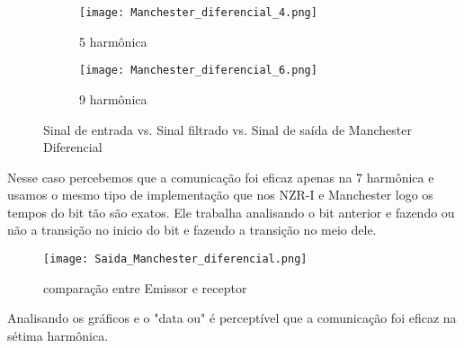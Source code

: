 \documentclass{article}
\begin{document}
\begin{figure}[H]
\begin{multicols}{2}
                    \begin{figure}[H]
                        \begin{center}
                            \texttt{[image: Manchester\_diferencial\_4.png]}
                            \caption{5 harmônica}
                            \label{fig:Manchester_diferencial_4}
                        \end{center}
                    \end{figure}
                    \begin{figure}[H]
                        \begin{center}
                            \texttt{[image: Manchester\_diferencial\_6.png]}
                            \caption{9 harmônica}
                            \label{fig:Manchester_diferencial_6}
                        \end{center}
                    \end{figure}
                \end{multicols}
                \caption{Sinal de entrada vs. Sinal filtrado vs. Sinal de saída de Manchester Diferencial}
                \label{fig:Manchester_diferencial}
            \end{figure}
            Nesse caso percebemos que a comunicação foi eficaz apenas na 7 harmônica e usamos o mesmo tipo de implementação que nos NZR-I e Manchester logo os tempos do bit tão são exatos. Ele trabalha analisando o bit anterior e fazendo ou não a transição no inicio do bit e fazendo a transição no meio dele.
            \begin{figure}[H]
                \begin{center}
                    \texttt{[image: Saida\_Manchester\_diferencial.png]}
                    \caption{comparação entre Emissor e receptor}
                    \label{fig:Saida_Manchester_diferencial}
                \end{center}
            \end{figure}
            Analisando os gráficos e o "data ou" é perceptível que a comunicação foi eficaz  na sétima harmônica.
\end{document}
